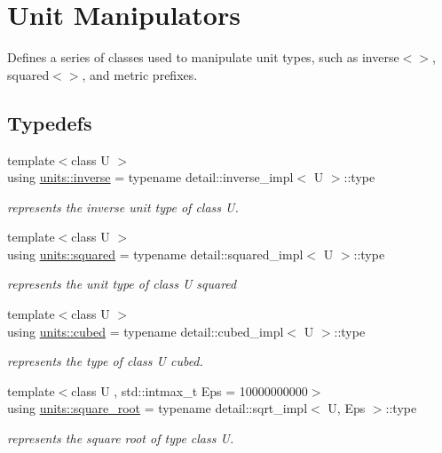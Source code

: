 \hypertarget{group___unit_manipulators}{}\section{Unit Manipulators}
\label{group___unit_manipulators}


Defines a series of classes used to manipulate unit types, such as {\ttfamily inverse$<$$>$}, {\ttfamily squared$<$$>$}, and metric prefixes.  


\subsection*{Typedefs}
\begin{DoxyCompactItemize}
\item 
{\footnotesize template$<$class U $>$ }\\using \hyperlink{group___unit_manipulators_gaacc539ef162e24b260d023d3ff949b57}{units\+::inverse} = typename detail\+::inverse\+\_\+impl$<$ U $>$\+::type
\begin{DoxyCompactList}\small\item\em represents the inverse unit type of {\ttfamily class U}. \end{DoxyCompactList}\item 
{\footnotesize template$<$class U $>$ }\\using \hyperlink{group___unit_manipulators_ga636346f7898c35eb98a796bec1d77fb2}{units\+::squared} = typename detail\+::squared\+\_\+impl$<$ U $>$\+::type
\begin{DoxyCompactList}\small\item\em represents the unit type of {\ttfamily class U} squared \end{DoxyCompactList}\item 
{\footnotesize template$<$class U $>$ }\\using \hyperlink{group___unit_manipulators_gad3e94dc693fe45a580b382cb666434a1}{units\+::cubed} = typename detail\+::cubed\+\_\+impl$<$ U $>$\+::type
\begin{DoxyCompactList}\small\item\em represents the type of {\ttfamily class U} cubed. \end{DoxyCompactList}\item 
{\footnotesize template$<$class U , std\+::intmax\+\_\+t Eps = 10000000000$>$ }\\using \hyperlink{group___unit_manipulators_ga66c5d3d0e80c7c3e56683d7df366b380}{units\+::square\+\_\+root} = typename detail\+::sqrt\+\_\+impl$<$ U, Eps $>$\+::type
\begin{DoxyCompactList}\small\item\em represents the square root of type {\ttfamily class U}. \end{DoxyCompactList}\end{DoxyCompactItemize}
